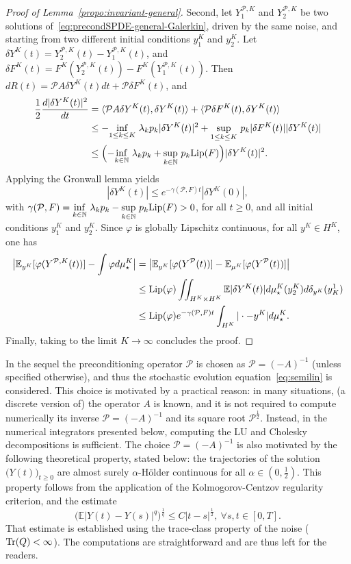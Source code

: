 \documentclass[11pt]{amsart}
\newcommand{\E}{\mathbb{E}}
\newcommand{\N}{\mathbb{N}}
\begin{document}
\begin{proof}[Proof of Lemma~\ref{propo:invariant-general}]
Second, let $Y_1^{\mathcal{P},K}$ and $Y_2^{\mathcal{P},K}$ be two solutions of~\eqref{eq:precondSPDE-general-Galerkin}, driven by the same noise, and starting from two different initial conditions $y_1^K$ and $y_2^K$. Let $\delta Y^K(t)=Y_2^{\mathcal{P},K}(t)-Y_1^{\mathcal{P},K}(t)$, and $\delta F^K(t)=F^K(Y_2^{\mathcal{P},K}(t))-F^K(Y_1^{\mathcal{P},K}(t))$. Then $dR(t)=\mathcal{P}A\delta Y^K(t)dt+\mathcal{P}\delta F^K(t)$, and
\begin{align*}
\frac{1}{2}\frac{d|\delta Y^K(t)|^2}{dt}&=\langle \mathcal{P}A\delta Y^K(t),\delta Y^K(t)\rangle+\langle \mathcal{P}\delta F^K(t),\delta Y^K(t)\rangle\\
&\le -\underset{1\le k\le K}\inf~\lambda_kp_k |\delta Y^K(t)|^2+\underset{1\le k\le K}\sup~p_k |\delta F^K(t)||\delta Y^K(t)|\\
&\le \Bigl(-\underset{k\in\N}\inf~\lambda_kp_k +\underset{k\in\N}\sup~p_k {\rm Lip}(F)\Bigr)|\delta Y^K(t)|^2.
\end{align*}
Applying the Gronwall lemma yields
\[
|\delta Y^K(t)|\le e^{-\gamma(\mathcal{P},F)t}|\delta Y^K(0)|,
\]
with $\gamma(\mathcal{P},F)=\underset{k\in\N}\inf~\lambda_kp_k -\underset{k\in\N}\sup~p_k {\rm Lip}(F)>0$, for all $t\ge 0$, and all initial conditions $y_1^K$ and $y_2^K$. Since $\varphi$ is globally Lipschitz continuous, for all $y^K\in H^K$, one has
\begin{align*}
\big|\E_{y^K}[\varphi(Y^{\mathcal{P},K}(t))]-\int \varphi d\mu_\star^{K}\big|&= \big|\E_{y^K}[\varphi(Y^{\mathcal{P}}(t))]-\E_{\mu^K}[\varphi(Y^{\mathcal{P}}(t))]\big|\\
&\le {\rm Lip}(\varphi)\iint_{H^K\times H^K}\E|\delta Y^K(t)| d\mu_\star^{K}(y_2^K) d\delta_{y^K}(y_K^1)\\
&\le {\rm Lip}(\varphi)e^{-\gamma(\mathcal{P},F)t}\int_{H^K}|\cdot -y^K|d\mu_{\star}^K.
\end{align*}
Finally, taking to the limit $K\to\infty$ concludes the proof.
\end{proof}


In the sequel the preconditioning operator $\mathcal{P}$ is chosen as $\mathcal{P}=(-A)^{-1}$ (unless specified otherwise), and thus the stochastic evolution equation~\eqref{eq:semilin} is considered. This choice is motivated by a practical reason: in many situations, (a discrete version of) the operator $A$ is known, and it is not required to compute numerically its inverse $\mathcal{P}=(-A)^{-1}$ and its square root $\mathcal{P}^{\frac12}$. Instead, in the numerical integrators presented below, computing the LU and Cholesky decompositions is sufficient.
%
The choice $\mathcal{P}=(-A)^{-1}$ is also motivated by the following theoretical property, stated below: the trajectories of the solution $\bigl(Y(t)\bigr)_{t\ge 0}$ are almost surely $\alpha$-H\"older continuous for all $\alpha\in(0,\frac12)$. This property follows from the application of the Kolmogorov-Centzov regularity criterion, and the estimate
\[
\bigl(\E|Y(t)-Y(s)|^q\bigr)^{\frac1q}\le C|t-s|^{\frac12},~\forall s,t\in[0,T].
\]
That estimate is established using the trace-class property of the noise (${\rm Tr}(Q)<\infty$). The computations are straightforward and are thus left for the readers.
\end{document}
